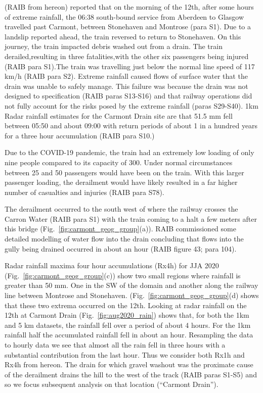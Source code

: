 \documentclass[11pt,a4paper]{article}
\begin{document}
\cite{carmontReport2024} (RAIB from hereon) reported that on the morning of the 12th, after some hours of extreme rainfall, the 06:38 south-bound service from Aberdeen to Glasgow travelled past Carmont, between Stonehaven and Montrose (para S1). Due to a landslip reported ahead, the train reversed to return to Stonehaven. On this journey, the train impacted debris washed out from a drain. The train derailed,resulting in three fatalities,with the other six passengers being injured (RAIB para S1).The train was travelling just below the normal line speed of 117 km/h (RAIB para S2). Extreme rainfall caused flows of surface water that the drain was unable to safely manage. This failure was because the drain was not designed to specification (RAIB paras S13-S16) and that railway operations did not fully account for the risks posed by the extreme rainfall (paras S29-S40). 1km Radar rainfall estimates for the Carmont Drain site are that 51.5 mm fell between 05:50 and about 09:00 with return periods of about 1 in a hundred years for a three hour accumulation (RAIB para S10.)

Due to the COVID-19 pandemic, the train had an extremely low loading of only nine people compared to its capacity of 300. Under normal circumstances between 25 and 50 passengers would have been on the train. With this larger passenger loading, the derailment would have likely resulted in a far higher number of casualties and injuries (RAIB para S78). 

The derailment occurred to the south west of where the railway crosses the Carron Water (RAIB para S1) with the train coming to a halt a few meters after this bridge (Fig.~\ref{fig:carmont_geog_group}(a)).  RAIB commissioned some detailed modelling of water flow into the drain concluding that  flows into the gully being drained occurred in about an hour (RAIB figure 43; para 104). 


Radar rainfall maxima four hour accumulations (Rx4h) for JJA 2020 (Fig.~\ref{fig:carmont_geog_group}(c)) show two small regions  where rainfall is greater than 50 mm. One in the SW of the domain and another along the railway line between Montrose and Stonehaven. (Fig.~\ref{fig:carmont_geog_group}(d) shows that these two extrema occurred on the 12th. Looking at radar rainfall on the 12th at Carmont Drain (Fig.~\ref{fig:aug2020_rain}) shows that, for both the 1km and 5 km datasets, the rainfall fell over a period of about 4 hours. For the 1km rainfall half the accumulated rainfall fell in about an hour.  Resampling the data to hourly data we see that almost all the rain fell in three hours with a substantial contribution from the last hour. Thus we consider both Rx1h and Rx4h from hereon. The drain for which gravel washout was the proximate cause of the derailment drains the hill to the west of the track (RAIB paras S1-S5) and so we focus subsequent analysis on that location (``Carmont Drain'').
\end{document}
